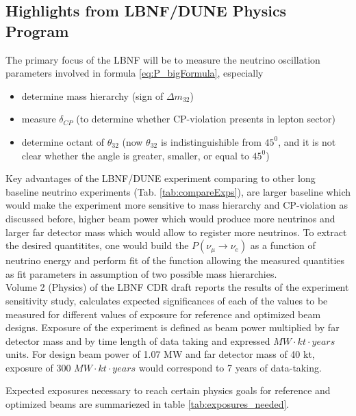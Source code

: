 \subsection{Highlights from LBNF/DUNE Physics Program}
The primary focus of the LBNF will be to measure the neutrino oscillation parameters involved in formula \ref{eq:P_bigFormula}, especially 
\begin{itemize}
\item determine mass hierarchy (sign of $\Delta{m_{32}}$)
\item measure $\delta_{CP}$ (to determine whether CP-violation presents in lepton sector)
\item determine octant of $\theta_{32}$ (now $\theta_{32}$ is indistinguishible from $45^0$, and it is not clear whether the angle is greater, smaller, or equal to $45^0$)
\end{itemize}
Key advantages of the LBNF/DUNE experiment comparing to other long baseline neutrino experiments (Tab. \ref{tab:compareExps}), are larger baseline which would make the experiment more sensitive to mass hierarchy and CP-violation as discussed before, higher beam power which would produce more neutrinos and larger far detector mass which would allow to register more neutrinos.  
To extract the desired quantitites, one would build the $P(\nu_\mu \rightarrow \nu_e)$ as a function of neutrino energy and perform fit of the function allowing the measured quantities as fit parameters in assumption of two possible mass hierarchies.\\
Volume 2 (Physics) of the LBNF CDR draft reports the results of the experiment sensitivity study, calculates expected significances of each of the values to be measured for different values of exposure for reference and optimized beam designs. Exposure of the experiment is defined as beam power multiplied by far detector mass and by time length of data taking and expressed   $MW \cdot kt \cdot years$ units. For design beam power of 1.07 MW and far detector mass of 40 kt, exposure of 300 $MW \cdot kt \cdot years$ would correspond to 7 years of data-taking.

Expected exposures necessary to reach certain physics goals for reference and optimized beams are summariezed in table \ref{tab:exposures_needed}.

